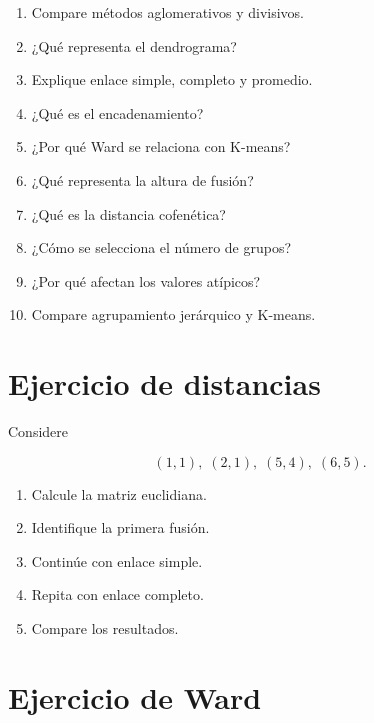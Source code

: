 \documentclass[
  spanish,
  10.5pt,
  letterpaper,
  DIV=11,
  numbers=noendperiod,
  oneside,
  open=any]{scrreprt}
\providecommand{\tightlist}{%
  \setlength{\itemsep}{0pt}\setlength{\parskip}{0pt}}
\theoremstyle{definition}
\theoremstyle{definition}
\theoremstyle{plain}
\theoremstyle{remark}
\begin{document}

\begin{enumerate}
\def\labelenumi{\arabic{enumi}.}
\tightlist
\item
  Compare métodos aglomerativos y divisivos.
\item
  ¿Qué representa el dendrograma?
\item
  Explique enlace simple, completo y promedio.
\item
  ¿Qué es el encadenamiento?
\item
  ¿Por qué Ward se relaciona con K-means?
\item
  ¿Qué representa la altura de fusión?
\item
  ¿Qué es la distancia cofenética?
\item
  ¿Cómo se selecciona el número de grupos?
\item
  ¿Por qué afectan los valores atípicos?
\item
  Compare agrupamiento jerárquico y K-means.
\end{enumerate}

\section*{Ejercicio de distancias}\label{ejercicio-de-distancias-1}


Considere

\[
(1,1),\;(2,1),\;(5,4),\;(6,5).
\]

\begin{enumerate}
\def\labelenumi{\arabic{enumi}.}
\tightlist
\item
  Calcule la matriz euclidiana.
\item
  Identifique la primera fusión.
\item
  Continúe con enlace simple.
\item
  Repita con enlace completo.
\item
  Compare los resultados.
\end{enumerate}

\section*{Ejercicio de Ward}\label{ejercicio-de-ward}

\end{document}
